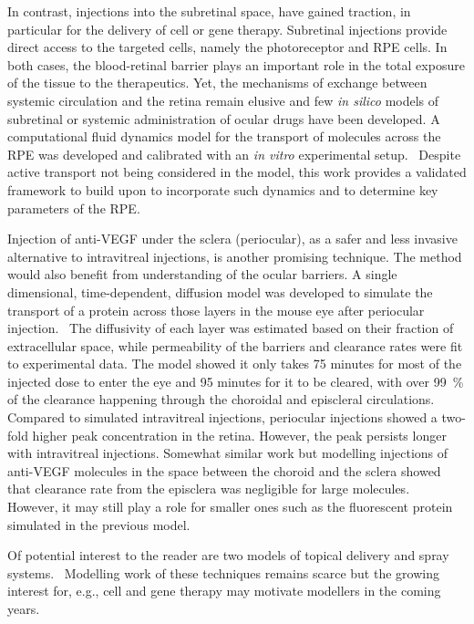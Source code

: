 \documentclass[12pt,a4paper]{journal}
\begin{document}
In contrast, injections into the subretinal space, have gained traction, in particular for the delivery of cell or gene therapy.
Subretinal injections provide direct access to the targeted cells, namely the photoreceptor and RPE cells.
In both cases, the blood-retinal barrier plays an important role in the total exposure of the tissue to the therapeutics.
Yet, the mechanisms of exchange between systemic circulation and the retina remain elusive and few \textit{in silico} models of subretinal or systemic administration of ocular drugs have been developed.
A computational fluid dynamics model for the transport of molecules across the RPE was developed and calibrated with an \textit{in vitro} experimental setup.~\cite{Davies_2020}
Despite active transport not being considered in the model, this work provides a validated framework to build upon to incorporate such dynamics and to determine key parameters of the RPE.

Injection of anti-VEGF under the sclera (periocular), as a safer and less invasive alternative to intravitreal injections, is another promising technique.
The method would also benefit from understanding of the ocular barriers.
A single dimensional, time-dependent, diffusion model was developed to simulate the transport of a protein across those layers in the mouse eye after periocular injection.~\cite{Gabhann_2007}
The diffusivity of each layer was estimated based on their fraction of extracellular space, while permeability of the barriers and clearance rates were fit to experimental data.
The model showed it only takes 75 minutes for most of the injected dose to enter the eye and 95 minutes for it to be cleared, with over \SI{99}{\percent} of the clearance happening through the choroidal and episcleral circulations.
Compared to simulated intravitreal injections, periocular injections showed a two-fold higher peak concentration in the retina.
However, the peak persists longer with intravitreal injections.
Somewhat similar work but modelling injections of anti-VEGF molecules in the space between the choroid and the sclera showed that clearance rate from the episclera was negligible for large molecules.~\cite{Zhang_2018}
However, it may still play a role for smaller ones such as the fluorescent protein simulated in the previous model.~\cite{Gabhann_2007}

Of potential interest to the reader are two models of topical delivery and spray systems.~\cite{Mori_2017,Nweze_2020}
Modelling work of these techniques remains scarce but the growing interest for, e.g., cell and gene therapy may motivate modellers in the coming years.



\end{document}
